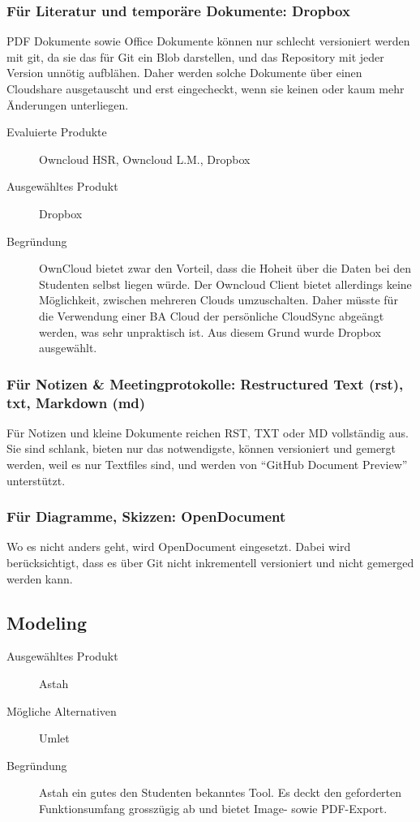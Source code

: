 			\subsubsection{Für Literatur und temporäre Dokumente: Dropbox}
			PDF Dokumente sowie Office Dokumente können nur schlecht versioniert werden mit git, 
			da sie das für Git ein Blob darstellen, und das Repository mit jeder Version unnötig aufblähen.
			Daher werden solche Dokumente über einen Cloudshare ausgetauscht und erst eingecheckt, 
			wenn sie keinen oder kaum mehr Änderungen unterliegen.
				
				\begin{description}
					\item[Evaluierte Produkte] Owncloud HSR, Owncloud L.M., Dropbox
					\item[Ausgewähltes Produkt] Dropbox
					\item[Begründung] OwnCloud bietet zwar den Vorteil, dass die Hoheit über die Daten bei den Studenten selbst liegen würde.
						Der Owncloud Client bietet allerdings keine Möglichkeit, 
						zwischen mehreren Clouds umzuschalten. 
						Daher müsste für die Verwendung einer BA Cloud der persönliche CloudSync abgeängt werden, 
						was sehr unpraktisch ist.
						Aus diesem Grund wurde Dropbox ausgewählt.
				\end{description}

			\subsubsection{Für Notizen \& Meetingprotokolle: Restructured Text (rst), txt, Markdown (md)}
				Für Notizen und kleine Dokumente reichen RST, TXT oder MD vollständig aus. 
				Sie sind schlank, bieten nur das notwendigste, können versioniert und gemergt werden,
				weil es nur Textfiles sind, und werden von "`GitHub Document Preview"'	unterstützt.

			\subsubsection{Für Diagramme, Skizzen: OpenDocument}
				Wo es nicht anders geht, wird OpenDocument eingesetzt. Dabei wird
				berücksichtigt, dass es über Git nicht inkrementell versioniert und nicht
				gemerged werden kann.


		\subsection{Modeling}
			\begin{description}
				\item[Ausgewähltes Produkt] Astah
				\item[Mögliche Alternativen] Umlet
				\item[Begründung] Astah ein gutes den Studenten bekanntes Tool.
					Es deckt den geforderten Funktionsumfang grosszügig ab und bietet Image- sowie PDF-Export.
			\end{description}
			

